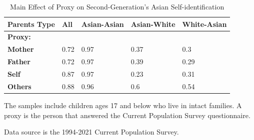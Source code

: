 \documentclass[12pt,english]{article}
\begin{document}
\begin{table}[H]
\centering\centering
\caption{Main Effect of Proxy on Second-Generation's Asian Self-identification \label{tab:hispbyproxy}}
\centering
\fontsize{12}{14}\selectfont
\begin{threeparttable}
\begin{tabular}[c]{>{}lllll}
\toprule
Parents Type & All & Asian-Asian & Asian-White & White-Asian\\
\midrule
\textbf{Proxy:} &  &  &  & \\
\hspace{1em}\textbf{Mother} & 0.72 & 0.97 & 0.37 & 0.3\\
\hspace{1em}\textbf{Father} & 0.72 & 0.97 & 0.39 & 0.29\\
\hspace{1em}\textbf{Self} & 0.87 & 0.97 & 0.23 & 0.31\\
\hspace{1em}\textbf{Others} & 0.88 & 0.96 & 0.6 & 0.54\\
\bottomrule
\end{tabular}
\begin{tablenotes}
\item[1] The samples include children ages 17 and below who live in intact families. A proxy is the person that answered the Current Population Survey questionnaire.
\item[2] Data source is the 1994-2021 Current Population Survey.
\end{tablenotes}
\end{threeparttable}
\end{table}


\pagebreak
\newpage

\end{document}
